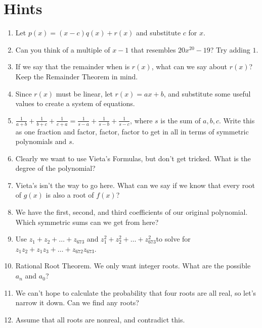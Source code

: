 \documentclass[12pt]{article}
\begin{document}
\newpage
\section{Hints}
\begin{enumerate}
    \item Let $p(x)=(x-c)q(x)+r(x)$ and substitute $c$ for $x$. 
    \item Can you think of a multiple of $x-1$ that resembles $20x^{20}-19$? Try adding $1$.
    \item If we say that the remainder when is $r(x)$, what can we say about $r(x)$? Keep the Remainder Theorem in mind.
    \item Since $r(x)$ must be linear, let $r(x)=ax+b$, and substitute some useful values to create a system of equations.
    \item $\frac{1}{a+b}+\frac{1}{b+c}+\frac{1}{c+a}=\frac{1}{s-a}+\frac{1}{s-b}+\frac{1}{s-c}$, where $s$ is the sum of $a,b,c$. Write this as one fraction and factor, factor, factor to get in all in terms of symmetric polynomials and $s$.
    \item Clearly we want to use Vieta's Formulas, but don't get tricked. What is the degree of the polynomial?
    \item Vieta's isn't the way to go here. What can we say if we know that every root of $g(x)$ is also a root of $f(x)$? 
    \item We have the first, second, and third coefficients of our original polynomial. Which symmetric sums can we get from here?
    \item Use $z_1+z_2+\dots +z_{673}$ and $z_1^2+z_2^2+\dots+z_{673}^2$to solve for $z_1z_2+z_1z_3+\dots+z_{672}z_{673}$.
    \item Rational Root Theorem. We only want integer roots. What are the possible $a_n$ and $a_0$?
    \item We can't hope to calculate the probability that four roots are all real, so let's narrow it down. Can we find any roots?
    \item Assume that all roots are nonreal, and contradict this.
\end{enumerate}
\end{document}
